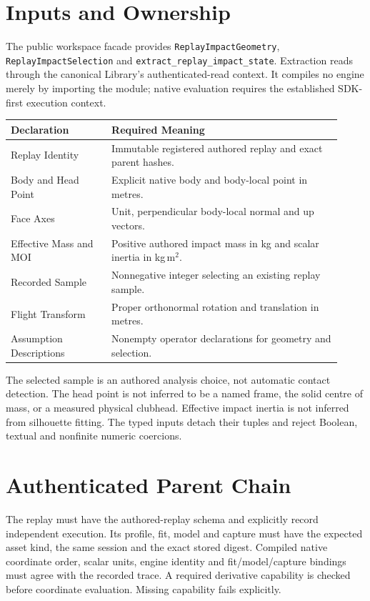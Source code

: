 \documentclass[11pt]{article}
\newcommand{\code}[1]{\nolinkurl{#1}}
\begin{document}
\newpage
\section*{Inputs and Ownership}
The public workspace facade provides \code{ReplayImpactGeometry},
\code{ReplayImpactSelection} and \code{extract_replay_impact_state}.
Extraction reads through the canonical Library's authenticated-read context.
It compiles no engine merely by importing the module; native evaluation requires
the established SDK-first execution context.

\begin{center}\small
\begin{tabular}{p{0.28\linewidth}p{0.64\linewidth}}\toprule
Declaration & Required Meaning\\\midrule
Replay Identity & Immutable registered authored replay and exact parent hashes.\\
Body and Head Point & Explicit native body and body-local point in metres.\\
Face Axes & Unit, perpendicular body-local normal and up vectors.\\
Effective Mass and MOI & Positive authored impact mass in kg and scalar inertia in kg\,m$^2$.\\
Recorded Sample & Nonnegative integer selecting an existing replay sample.\\
Flight Transform & Proper orthonormal rotation and translation in metres.\\
Assumption Descriptions & Nonempty operator declarations for geometry and selection.\\\bottomrule
\end{tabular}
\end{center}

The selected sample is an authored analysis choice, not automatic contact
detection. The head point is not inferred to be a named frame, the solid centre
of mass, or a measured physical clubhead. Effective impact inertia is not inferred
from silhouette fitting. The typed inputs detach their tuples and reject Boolean,
textual and nonfinite numeric coercions.

\section*{Authenticated Parent Chain}
The replay must have the authored-replay schema and explicitly record independent
execution. Its profile, fit, model and capture must have the expected asset kind,
the same session and the exact stored digest. Compiled native coordinate order,
scalar units, engine identity and fit/model/capture bindings must agree with the
recorded trace. A required derivative capability is checked before coordinate
evaluation. Missing capability fails explicitly.
\end{document}
